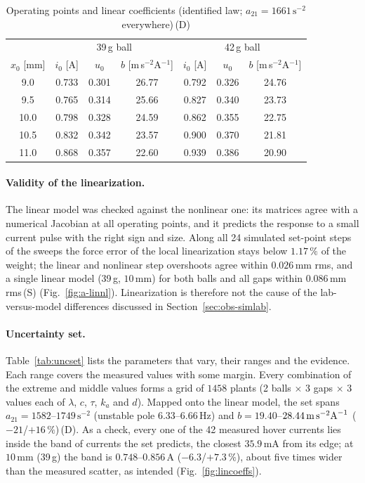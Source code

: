 \documentclass[11pt,a4paper]{article}
\newcommand{\st}[1]{\,\textup{(#1)}}
\begin{document}
\begin{table}[H]
\centering
\caption[Operating points and linear coefficients]{Operating points and linear coefficients (identified law; $a_{21}=1661\,\text{s}^{-2}$ everywhere)\st{D}}
\label{tab:oppoints}
\begin{tabular}{@{}c|ccc|ccc@{}}
\toprule
 & \multicolumn{3}{c|}{39\,g ball} & \multicolumn{3}{c}{42\,g ball} \\
$x_0$ [mm] & $i_0$ [A] & $u_0$ & $b$ [m\,s$^{-2}$A$^{-1}$] & $i_0$ [A] & $u_0$ & $b$ [m\,s$^{-2}$A$^{-1}$] \\
\midrule
9.0  & 0.733 & 0.301 & 26.77 & 0.792 & 0.326 & 24.76 \\
9.5  & 0.765 & 0.314 & 25.66 & 0.827 & 0.340 & 23.73 \\
10.0 & 0.798 & 0.328 & 24.59 & 0.862 & 0.355 & 22.75 \\
10.5 & 0.832 & 0.342 & 23.57 & 0.900 & 0.370 & 21.81 \\
11.0 & 0.868 & 0.357 & 22.60 & 0.939 & 0.386 & 20.90 \\
\bottomrule
\end{tabular}
\end{table}

\paragraph{Validity of the linearization.} The linear model was checked against the nonlinear one: its matrices agree with
a numerical Jacobian at all operating points, and it predicts the response to a small current pulse with the right sign and
size. Along all 24 simulated set-point steps of the sweeps the force error of the local linearization stays below
$1.17\,\%$ of the weight; the linear and nonlinear step overshoots agree within $0.026$\,mm rms, and a single linear model
(39\,g, $10$\,mm) for both balls and all gaps within $0.086$\,mm rms\st{S} (Fig.~\ref{fig:a-linnl}). Linearization is therefore
not the cause of the lab-versus-model differences discussed in Section~\ref{sec:obs-simlab}.

\paragraph{Uncertainty set.} Table~\ref{tab:uncset} lists the parameters that vary, their ranges and the evidence. Each
range covers the measured values with some margin. Every combination of the extreme and middle values forms a grid of
$1458$ plants (2 balls $\times$ 3 gaps $\times$ 3 values each of $\lambda$, $c$, $\tau$, $k_a$ and $d$). Mapped onto the linear model,
the set spans $a_{21} = 1582$--$1749\,\text{s}^{-2}$ (unstable pole $6.33$--$6.66$\,Hz) and $b = 19.40$--$28.44\,\text{m\,s}^{-2}\text{A}^{-1}$
($-21$/$+16\,\%$)\st{D}. As a check, every one of the 42 measured hover currents lies inside the band of currents the set
predicts, the closest $35.9$\,mA from its edge; at $10$\,mm (39\,g) the band is $0.748$--$0.856$\,A ($-6.3$/$+7.3\,\%$),
about five times wider than the measured scatter, as intended (Fig.~\ref{fig:lincoeffs}).
\end{document}
